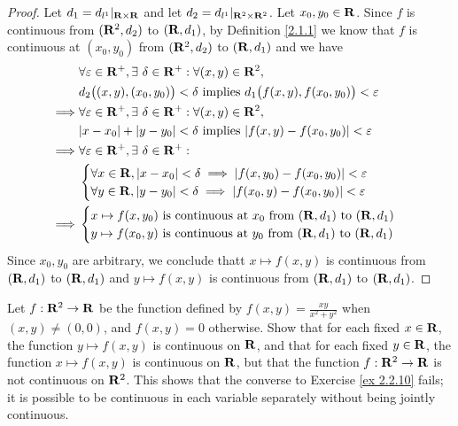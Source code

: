 \begin{proof}
    Let \(d_1 = d_{l^1}|_{\mathbf{R} \times \mathbf{R}}\) and let \(d_2 = d_{l^1}|_{\mathbf{R}^2 \times \mathbf{R}^2}\).
    Let \(x_0, y_0 \in \mathbf{R}\).
    Since \(f\) is continuous from \((\mathbf{R}^2, d_2)\) to \((\mathbf{R}, d_1)\), by Definition \ref{2.1.1} we know that \(f\) is continuous at \((x_0, y_0)\) from \((\mathbf{R}^2, d_2)\) to \((\mathbf{R}, d_1)\) and we have
    \begin{align*}
                 & \forall \varepsilon \in \R^+, \exists\ \delta \in \R^+ : \forall (x, y) \in \R^2,                         \\
                 & d_2\big((x, y), (x_0, y_0)\big) < \delta \text{ implies } d_1\big(f(x, y), f(x_0, y_0)\big) < \varepsilon \\
        \implies & \forall \varepsilon \in \R^+, \exists\ \delta \in \R^+ : \forall (x, y) \in \R^2,                         \\
                 & \abs{x - x_0} + \abs{y - y_0} < \delta \text{ implies } \abs{f(x, y) - f(x_0, y_0)} < \varepsilon         \\
        \implies & \forall \varepsilon \in \R^+, \exists\ \delta \in \R^+ :                                                  \\
                 & \begin{cases}
                       \forall x \in \R, \abs{x - x_0} < \delta \implies \abs{f(x, y_0) - f(x_0, y_0)} < \varepsilon \\
                       \forall y \in \R, \abs{y - y_0} < \delta \implies \abs{f(x_0, y) - f(x_0, y_0)} < \varepsilon
                   \end{cases}             \\
        \implies & \begin{cases}
                       x \mapsto f(x, y_0) \text{ is continuous at } x_0 \text{ from } (\R, d_1) \text{ to } (\R, d_1) \\
                       y \mapsto f(x_0, y) \text{ is continuous at } y_0 \text{ from } (\R, d_1) \text{ to } (\R, d_1)
                   \end{cases}
    \end{align*}
    Since \(x_0, y_0\) are arbitrary, we conclude thatt \(x \mapsto f(x, y)\) is continuous from \((\mathbf{R}, d_1)\) to \((\mathbf{R}, d_1)\) and \(y \mapsto f(x, y)\) is continuous from \((\mathbf{R}, d_1)\) to \((\mathbf{R}, d_1)\).
\end{proof}

\begin{exercise}\label{ex 2.2.11}
    Let \(f : \mathbf{R}^2 \to \mathbf{R}\) be the function defined by \(f(x, y) = \frac{xy}{x^2 + y^2}\) when \((x, y) \neq (0, 0)\), and \(f(x, y) = 0\) otherwise.
    Show that for each fixed \(x \in \mathbf{R}\), the function \(y \mapsto f(x, y)\) is continuous on \(\mathbf{R}\), and that for each fixed \(y \in \mathbf{R}\), the function \(x \mapsto f(x, y)\) is continuous on \(\mathbf{R}\), but that the function \(f : \mathbf{R}^2 \to \mathbf{R}\) is not continuous on \(\mathbf{R}^2\).
    This shows that the converse to Exercise \ref{ex 2.2.10} fails;
    it is possible to be continuous in each variable separately without being jointly continuous.
\end{exercise}

